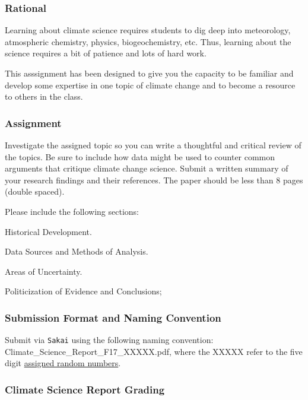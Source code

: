 
\subsubsection{Rational}

Learning about climate science requires students to dig deep into meteorology, atmospheric chemistry, physics, biogeochemistry, etc. Thus, learning about the science requires a bit of patience and lots of hard work. 

This asssignment has been designed to give you the capacity to be familiar and develop some expertise in one topic of climate change and to become a resource to others in the class.

\subsubsection{Assignment}

Investigate the assigned topic so you can write a thoughtful and critical review of the topics. Be sure to include how data might be used to counter common arguments that critique climate change science. Submit a written summary of your research findings and their references. The paper should be less than 8 pages (double spaced). 

Please include the following sections:

\begin{itemize*}
  \item Historical Development.
  \item Data Sources and Methods of Analysis.
  \item Areas of Uncertainty.
  \item Politicization of Evidence and Conclusions;
\end{itemize*}
 
\subsubsection{Submission Format and Naming Convention}

Submit via \texttt{Sakai} using the following naming convention: Climate\_Science\_Report\_F17\_XXXXX.pdf, where the XXXXX refer to the five digit \href{https://github.com/marclos/Climate_Change_Narratives/raw/master/Admin/RandomNumbers.pdf}{assigned random numbers}.

\subsubsection{Climate Science Report Grading}

